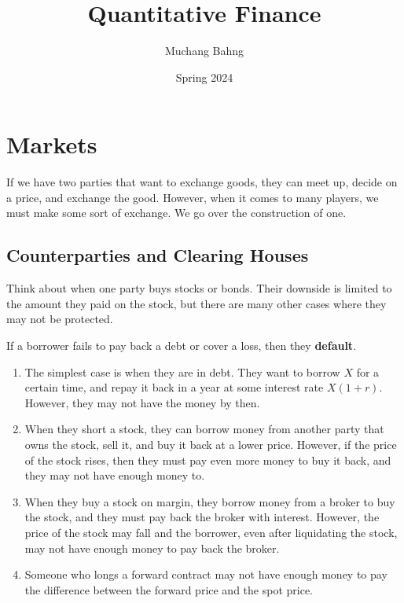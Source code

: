 \documentclass{article}
\begin{document}
\title{Quantitative Finance}
\author{Muchang Bahng}
\date{Spring 2024}

\maketitle
\tableofcontents
\pagebreak

\section{Markets}

  If we have two parties that want to exchange goods, they can meet up, decide on a price, and exchange the good. However, when it comes to many players, we must make some sort of exchange. We go over the construction of one. 

  \subsection{Counterparties and Clearing Houses}

    Think about when one party buys stocks or bonds. Their downside is limited to the amount they paid on the stock, but there are many other cases where they may not be protected. 

    \begin{definition}[Default]
      If a borrower fails to pay back a debt or cover a loss, then they \textbf{default}. 
    \end{definition}

    \begin{example}
      \begin{enumerate}
        \item The simplest case is when they are in debt. They want to borrow $X$ for a certain time, and repay it back in a year at some interest rate $X (1 + r)$. However, they may not have the money by then. 
        \item When they short a stock, they can borrow money from another party that owns the stock, sell it, and buy it back at a lower price. However, if the price of the stock rises, then they must pay even more money to buy it back, and they may not have enough money to. 
        \item When they buy a stock on margin, they borrow money from a broker to buy the stock, and they must pay back the broker with interest. However, the price of the stock may fall and the borrower, even after liquidating the stock, may not have enough money to pay back the broker.
        \item Someone who longs a forward contract may not have enough money to pay the difference between the forward price and the spot price.
      \end{enumerate}
    \end{example}
\end{document}
